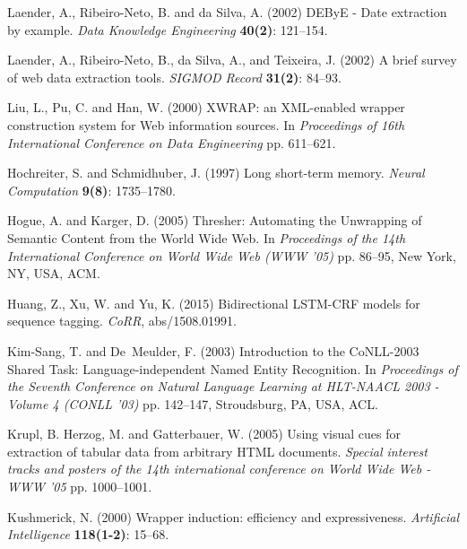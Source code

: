 \documentclass{nle}
\begin{document}
\begin{thebibliography}{}
Laender, A., Ribeiro-Neto, B. and da Silva, A. (2002)
DEByE - Date extraction by example.
{\it Data Knowledge Engineering}
{\bf 40(2)}: 121--154.

Laender, A., Ribeiro-Neto, B., da Silva, A., and Teixeira, J. (2002)
A brief survey of web data extraction tools.
{\it SIGMOD Record}
{\bf 31(2)}: 84--93.

Liu, L., Pu, C. and Han, W. (2000)
XWRAP: an XML-enabled wrapper construction system for Web information sources.
In {\it Proceedings of 16th International Conference on Data Engineering}
pp. 611--621.

Hochreiter, S. and Schmidhuber, J. (1997)
Long short-term memory.
{\it Neural Computation}
{\bf 9(8)}: 1735--1780.

Hogue, A. and Karger, D. (2005)
Thresher: Automating the Unwrapping of Semantic Content from the World Wide Web.
In {\it Proceedings of the 14th International Conference on World Wide Web (WWW '05)}
pp. 86--95, New York, NY, USA, ACM.

Huang, Z., Xu, W. and Yu, K. (2015)
Bidirectional {LSTM-CRF} models for sequence tagging.
{\it CoRR}, abs/1508.01991.

Kim-Sang, T. and De~Meulder, F. (2003)
Introduction to the CoNLL-2003 Shared Task: Language-independent Named Entity Recognition.
In {\it Proceedings of the Seventh Conference on Natural Language Learning at HLT-NAACL 2003 - Volume 4 (CONLL '03)}
pp. 142--147, Stroudsburg, PA, USA, ACL.

Krupl, B. Herzog, M. and Gatterbauer, W. (2005)
Using visual cues for extraction of tabular data from arbitrary HTML documents.
{\it Special interest tracks and posters of the 14th international conference on World Wide Web - WWW '05} 
pp. 1000--1001.

Kushmerick, N. (2000) 
Wrapper induction: efficiency and expressiveness.
{\it Artificial Intelligence\/} 
{\bf 118(1-2)}: 15--68.


\end{thebibliography}
\end{document}
